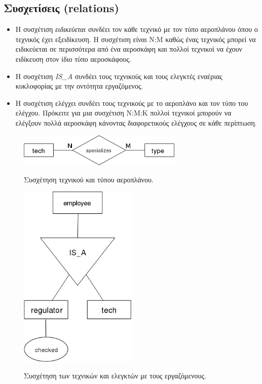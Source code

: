 \documentclass[a4paper]{article}
\begin{document}
\pagebreak
\subsection{Συσχετίσεις (relations)}
\begin{itemize}
\item Η συσχέτιση \emph{ειδικεύεται} συνδέει τον κάθε τεχνικό με τον τύπο
αεροπλάνου όπου ο τεχνικός έχει εξειδίκευση. Η συσχέτιση είναι Ν:Μ καθώς ένας
τεχνικός μπορεί να ειδικεύεται σε περισσότερα από ένα αεροσκάφη και πολλοί
τεχνικοί να έχουν ειδίκευση στον ίδιο τύπο αεροσκάφους.
\item Η συσχέτιση \emph{IS\_A} συνδέει τους τεχνικούς και τους ελεγκτές
εναέριας κυκλοφορίας με την οντότητα εργαζόμενος.
\item Η συσχέτιση ελέγχει συνδέει τους τεχνικούς με το αεροπλάνο και τον τύπο
του ελέγχου. Πρόκειτε για μια συσχέτιση Ν:Μ:Κ πολλοί τεχνικοί μπορούν να
ελέγξουν πολλά αεροσκάφη κάνοντας διαφορετικούς ελέγχους σε κάθε περίπτωση.
\end{itemize}
\begin{figure}[h]
\centering
\includegraphics[width=0.7\textwidth]{../../ER_model/aviation_relations_1a.png}\\
\caption{Συσχέτηση τεχνικού και τύπου αεροπλάνου.}
\end{figure}

\begin{figure}[h]
\centering
\includegraphics[width=0.5\textwidth]{../../ER_model/aviation_relations_1b.png}\\
\caption{Συσχέτηση των τεχνικών και ελεγκτών με τους εργαζόμενους.}
\end{figure}
\end{document}

